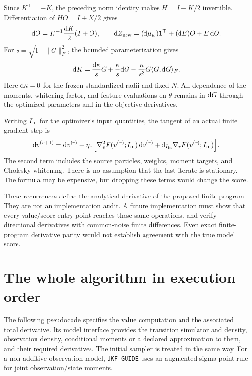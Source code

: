 Since \(K^\top=-K\), the preceding norm identity makes
\(H=I-K/2\) invertible. Differentiation of \(HO=I+K/2\) gives
\begin{equation}
\label{eq:bf-covariance-proposal-cayley-tangent}
 \mathrm d O=H^{-1}\frac{\mathrm d K}{2}(I+O),\qquad
 \mathrm d Z_{\rm new}=(\mathrm d\mu_w)\mathbf 1^\top+(\mathrm d E)O+E\,\mathrm d O .
\end{equation}
For \(s=\sqrt{1+\|G\|_F^2}\), the bounded parameterization gives
\[
 \mathrm d K=\frac{\mathrm d\kappa}{s}G+\frac{\kappa}{s}\mathrm d G
       -\frac{\kappa}{s^3}G\langle G,\mathrm d G\rangle_F.
\]
Here \(\mathrm d\kappa=0\) for the frozen standardized radii and fixed \(N\).
All dependence of the moments, whitening factor, and feature evaluations
on \(\theta\) remains in \(\mathrm d G\) through the optimized parameters
and in the objective derivatives.

Writing \(I_{\rm in}\) for the optimizer's input quantities, the tangent
of an actual finite gradient step is
\begin{equation}
\label{eq:bf-covariance-proposal-optimizer-tangent}
 \mathrm d v^{(r+1)}
 =\mathrm d v^{(r)}
 -\eta_r\left[
   \nabla_v^2F(v^{(r)};I_{\rm in})\,\mathrm d v^{(r)}
   +\mathrm d_{I_{\rm in}}\nabla_vF(v^{(r)};I_{\rm in})\right].
\end{equation}
The second term includes the source particles, weights, moment targets,
and Cholesky whitening. There is no assumption that the last iterate is
stationary. The formula may be expensive, but dropping these terms would
change the score.

These recurrences define the analytical derivative of the proposed
finite program. They are not an implementation audit. A future implementation
must show that every value/score entry point reaches these same operations,
and verify directional derivatives with common-noise finite differences.
Even exact finite-program derivative parity would not establish agreement
with the true model score.


\section{The whole algorithm in execution order}

The following pseudocode specifies the value computation and the associated
total derivative. Its model interface provides the transition simulator and
density, observation density, conditional moments or a declared approximation
to them, and their required derivatives. The initial sampler is treated in
the same way. For a non-additive observation model, \texttt{UKF\_GUIDE}
uses an augmented sigma-point rule for joint observation/state moments.

